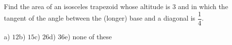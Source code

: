 Find the area of an isosceles trapezoid whose altitude is $3$ and in which the tangent of the angle between the (longer) base and a diagonal is $\dfrac14$.

a) $12$\quad b) $15$\quad c) $26$\quad d) $36$\quad e) none of these
